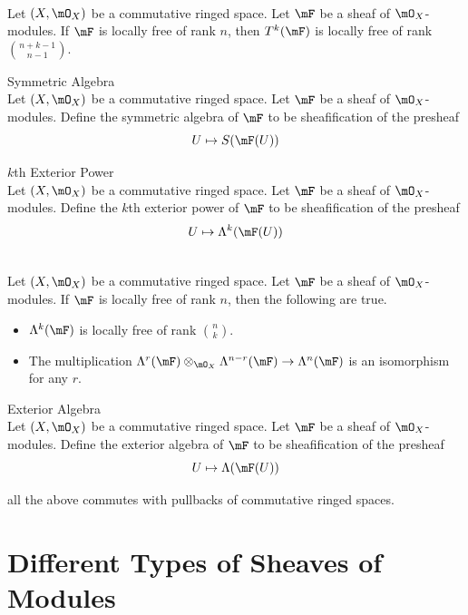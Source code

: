 \documentclass[a4paper]{article}
\begin{document}
\begin{lmm}{}{}\\
Let $(X,\mO_X)$ be a commutative ringed space. Let $\mF$ be a sheaf of $\mO_X$-modules. If $\mF$ is locally free of rank $n$, then $T^k(\mF)$ is locally free of rank $\binom{n+k-1}{n-1}$. 
\end{lmm}

\begin{defn}{Symmetric Algebra}{}\\
Let $(X,\mO_X)$ be a commutative ringed space. Let $\mF$ be a sheaf of $\mO_X$-modules. Define the symmetric algebra of $\mF$ to be sheafification of the presheaf $$U\mapsto S(\mF(U))$$
\end{defn}

\begin{defn}{$k$th Exterior Power}{}\\
Let $(X,\mO_X)$ be a commutative ringed space. Let $\mF$ be a sheaf of $\mO_X$-modules. Define the $k$th exterior power of $\mF$ to be sheafification of the presheaf $$U\mapsto\Lambda^k(\mF(U))$$
\end{defn}

\begin{lmm}{}{}\\
Let $(X,\mO_X)$ be a commutative ringed space. Let $\mF$ be a sheaf of $\mO_X$-modules. If $\mF$ is locally free of rank $n$, then the following are true. 
\begin{itemize}
\item $\Lambda^k(\mF)$ is locally free of rank $\binom{n}{k}$. 
\item The multiplication $\Lambda^r(\mF)\otimes_{\mO_X}\Lambda^{n-r}(\mF)\to\Lambda^n(\mF)$ is an isomorphism for any $r$. 
\end{itemize}
\end{lmm}

\begin{defn}{Exterior Algebra}{}\\
Let $(X,\mO_X)$ be a commutative ringed space. Let $\mF$ be a sheaf of $\mO_X$-modules. Define the exterior algebra of $\mF$ to be sheafification of the presheaf $$U\mapsto\Lambda(\mF(U))$$
\end{defn}

all the above commutes with pullbacks of commutative ringed spaces. 

\pagebreak
\section{Different Types of Sheaves of Modules}
\end{document}
